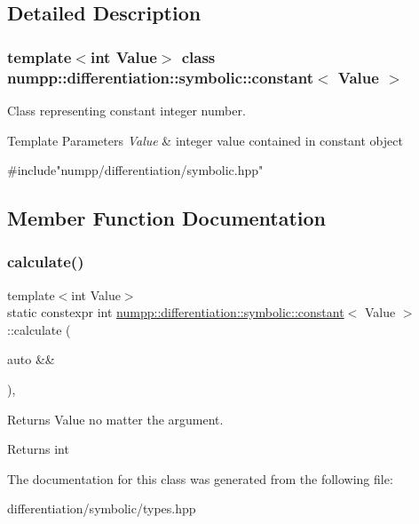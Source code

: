 \subsection{Detailed Description}
\subsubsection*{template$<$int Value$>$\newline
class numpp\+::differentiation\+::symbolic\+::constant$<$ Value $>$}

Class representing constant integer number. 


\begin{DoxyTemplParams}{Template Parameters}
{\em Value} & integer value contained in constant object\\
\hline
\end{DoxyTemplParams}

\begin{DoxyCode}
\textcolor{preprocessor}{#include"numpp/differentiation/symbolic.hpp"}
\end{DoxyCode}
 

\subsection{Member Function Documentation}
\mbox{\label{classnumpp_1_1differentiation_1_1symbolic_1_1constant_a8107c312e0715c40161432bf072fcfa9}} 
\subsubsection{\texorpdfstring{calculate()}{calculate()}}
{\footnotesize\ttfamily template$<$int Value$>$ \\
static constexpr int \hyperlink{classnumpp_1_1differentiation_1_1symbolic_1_1constant}{numpp\+::differentiation\+::symbolic\+::constant}$<$ Value $>$\+::calculate (\begin{DoxyParamCaption}\item[{auto \&\&}]{ }\end{DoxyParamCaption})\hspace{0.3cm}{\ttfamily [inline]}, {\ttfamily [static]}}



Returns Value no matter the argument. 

\begin{DoxyReturn}{Returns}
int 
\end{DoxyReturn}


The documentation for this class was generated from the following file\+:\begin{DoxyCompactItemize}
\item 
differentiation/symbolic/types.\+hpp\end{DoxyCompactItemize}

